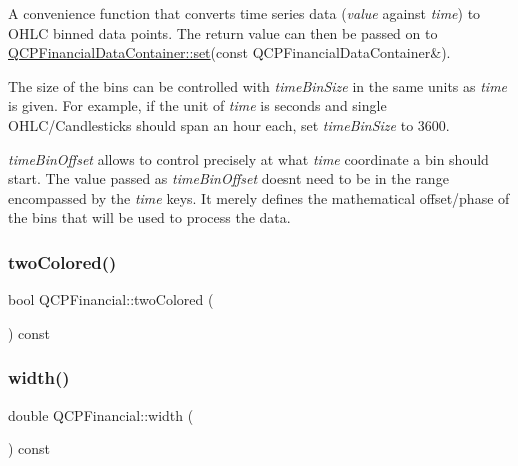A convenience function that converts time series data ({\itshape value} against {\itshape time}) to O\+H\+LC binned data points. The return value can then be passed on to \mbox{\hyperlink{class_q_c_p_data_container_ae7042bd534fc3ce7befa2ce3f790b5bf}{Q\+C\+P\+Financial\+Data\+Container\+::set}}(const Q\+C\+P\+Financial\+Data\+Container\&).

The size of the bins can be controlled with {\itshape time\+Bin\+Size} in the same units as {\itshape time} is given. For example, if the unit of {\itshape time} is seconds and single O\+H\+L\+C/\+Candlesticks should span an hour each, set {\itshape time\+Bin\+Size} to 3600.

{\itshape time\+Bin\+Offset} allows to control precisely at what {\itshape time} coordinate a bin should start. The value passed as {\itshape time\+Bin\+Offset} doesn\textquotesingle{}t need to be in the range encompassed by the {\itshape time} keys. It merely defines the mathematical offset/phase of the bins that will be used to process the data. \mbox{\label{class_q_c_p_financial_afd4b51de5be8e53776b649f9877a50e6}} 
\subsubsection{\texorpdfstring{twoColored()}{twoColored()}}
{\footnotesize\ttfamily bool Q\+C\+P\+Financial\+::two\+Colored (\begin{DoxyParamCaption}{ }\end{DoxyParamCaption}) const\hspace{0.3cm}{\ttfamily [inline]}}

\mbox{\label{class_q_c_p_financial_a12548f13658eda5833204ef60f524870}} 
\subsubsection{\texorpdfstring{width()}{width()}}
{\footnotesize\ttfamily double Q\+C\+P\+Financial\+::width (\begin{DoxyParamCaption}{ }\end{DoxyParamCaption}) const\hspace{0.3cm}{\ttfamily [inline]}}

